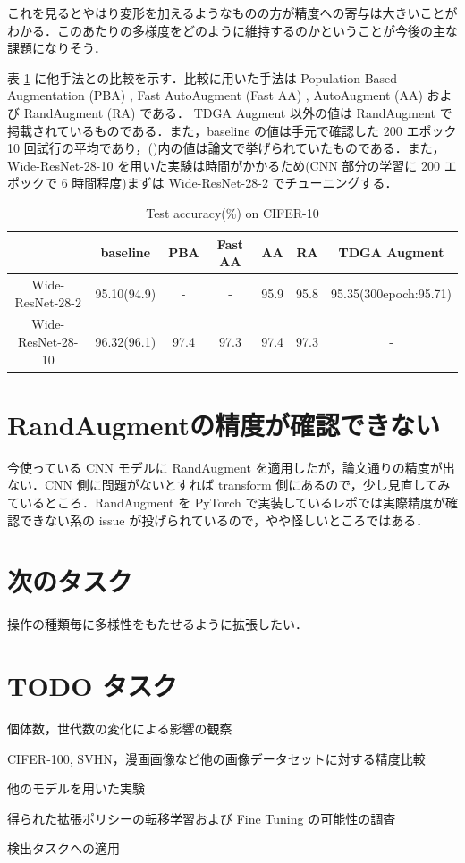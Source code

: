 \documentclass[onecolumn]{ujarticle}   %
\begin{document}
  これを見るとやはり変形を加えるようなものの方が精度への寄与は大きいことがわかる．このあたりの多様度をどのように維持するのかということが今後の主な課題になりそう．

  表 \ref{tab:compare_cider10} に他手法との比較を示す．比較に用いた手法は Population Based Augmentation (PBA) \cite{DBLP:journals/corr/abs-1905-05393}, Fast AutoAugment (Fast AA) \cite{DBLP:journals/corr/abs-1905-00397}, AutoAugment (AA) \cite{DBLP:journals/corr/abs-1801-02929} および  RandAugment (RA) \cite{Cubuk2019RandAugmentPA} である． TDGA Augment 以外の値は RandAugment で掲載されているものである．また，baseline の値は手元で確認した 200 エポック 10 回試行の平均であり，()内の値は論文で挙げられていたものである．また，Wide-ResNet-28-10 を用いた実験は時間がかかるため(CNN 部分の学習に 200 エポックで 6 時間程度)まずは Wide-ResNet-28-2 でチューニングする．

  \begin{table}[ht]
		\centering
		\caption{Test accuracy(\%) on CIFER-10}
		\label{tab:compare_cider10}
		\begin{tabular}{c||c c c c c|c} \hline
		  &baseline&PBA&Fast AA&AA&RA&TDGA Augment\\ \hline
			Wide-ResNet-28-2&95.10(94.9)&-&-&95.9&95.8&95.35(300epoch:95.71)\\
			Wide-ResNet-28-10&96.32(96.1)&97.4&97.3&97.4&97.3&-\\ \hline
		\end{tabular}
	\end{table}

  \section{RandAugmentの精度が確認できない}
  今使っている CNN モデルに RandAugment を適用したが，論文通りの精度が出ない．CNN 側に問題がないとすれば transform 側にあるので，少し見直してみているところ．RandAugment を PyTorch で実装しているレポでは実際精度が確認できない系の issue が投げられているので，やや怪しいところではある．

	\section{次のタスク}
	操作の種類毎に多様性をもたせるように拡張したい．

  \section{TODO タスク}
  \begin{itemize}{
    \item{個体数，世代数の変化による影響の観察}
    \item{CIFER-100, SVHN，漫画画像など他の画像データセットに対する精度比較}
    \item{他のモデルを用いた実験}
    \item{得られた拡張ポリシーの転移学習および Fine Tuning の可能性の調査}
    \item{検出タスクへの適用}

	}\end{itemize}

	
	
\end{document}
